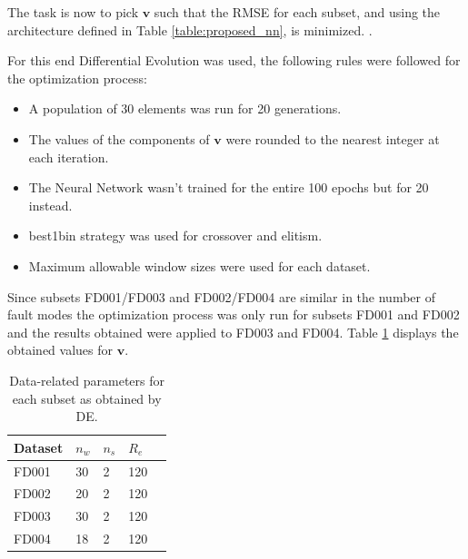\documentclass{beamer}
\begin{document}
\begin{darkframes}
     \begin{frame}
     
     The task is now to pick $\mathbf{v}$ such that the RMSE for each subset, and using the architecture defined in Table \ref{table:proposed_nn}, is minimized. \vspace{1em}.
     
     For this end Differential Evolution was used, the following rules were followed for the optimization process:
     
     \begin{itemize}
     \item A population of 30 elements was run for 20 generations.
     \item The values of the components of $\mathbf{v}$ were rounded to the nearest integer at each iteration.
     \item The Neural Network wasn't trained for the entire 100 epochs but for 20 instead.
     \item best1bin strategy was used for crossover and elitism.
     \item Maximum allowable window sizes were used for each dataset.
     \end{itemize}
     
     \end{frame}
     
          \begin{frame}
     
     Since subsets FD001/FD003 and FD002/FD004 are similar in the number of fault modes the optimization process was only run for subsets FD001 and FD002 and the results obtained were applied to FD003 and FD004. Table \ref{table:data_params_de} displays the obtained values for $\mathbf{v}$. \vspace{1em}
     
     \begin{table}[!htb]
\centering
\begin{tabular}{l l l l l}
	\hline
	 Dataset & $n_w$ &$n_s$ & $R_e$\\
  	\hline
  	FD001 & 30 & 2 & 120\\
  	FD002 & 20 & 2 & 120\\
  	FD003 & 30 & 2 & 120\\
  	FD004 & 18 & 2 & 120\\
  	\hline
\end{tabular}
\caption{Data-related parameters for each subset as obtained by DE.}
\label{table:data_params_de}
\end{table}
     

\end{frame}
\end{darkframes}
\end{document}
